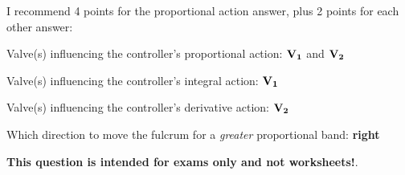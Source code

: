 





I recommend 4 points for the proportional action answer, plus 2 points for each other answer:

\vskip 10pt

Valve(s) influencing the controller's proportional action: ${\bf V_1}$ and ${\bf V_2}$

\vskip 10pt

Valve(s) influencing the controller's integral action: ${\bf V_1}$ 

\vskip 10pt

Valve(s) influencing the controller's derivative action: ${\bf V_2}$ 

\vskip 10pt

Which direction to move the fulcrum for a {\it greater} proportional band: {\bf right}








{\bf This question is intended for exams only and not worksheets!}.



